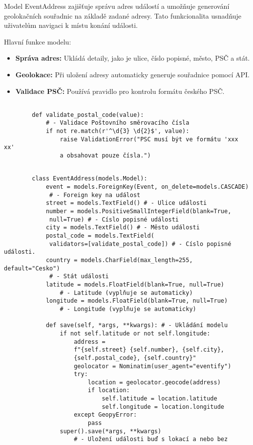 \documentclass[12pt, a4paper,
twoside,        %
openright
]{report}
\begin{document}
\begin{enumerate}
	Model EventAddress zajišťuje správu adres událostí a umožňuje generování geolokačních souřadnic na základě zadané adresy. Tato funkcionalita usnadňuje uživatelům navigaci k místu konání události.
	
	Hlavní funkce modelu:
	
	\begin{itemize}
		\item \textbf{Správa adres:} Ukládá detaily, jako je ulice, číslo popisné, město, PSČ a stát.
		\item \textbf{Geolokace:} Při uložení adresy automaticky generuje souřadnice pomocí API.
		\item \textbf{Validace PSČ:} Používá pravidlo pro kontrolu formátu českého PSČ.
	\end{itemize}
	
	
	\begin{lstlisting}[style=Python, caption={Validace PSČ}]
		
		def validate_postal_code(value): 
			# - Validace Poštovního směrovacího čísla
			if not re.match(r'^\d{3} \d{2}$', value):
				raise ValidationError("PSC musí být ve formátu 'xxx xx' 
				a obsahovat pouze čísla.")
	\end{lstlisting}
	
	\begin{lstlisting}[style=Python, caption={Model EventAddress}]
	
		class EventAddress(models.Model):
			event = models.ForeignKey(Event, on_delete=models.CASCADE)
			 # - Foreign key na událost
			street = models.TextField() # - Ulice události
			number = models.PositiveSmallIntegerField(blank=True,
			 null=True) # - Císlo popisné události
			city = models.TextField() # - Město události
			postal_code = models.TextField(
			 validators=[validate_postal_code]) # - Císlo popisné události.
			country = models.CharField(max_length=255, default="Cesko")
			 # - Stát události
			latitude = models.FloatField(blank=True, null=True)
				# - Latitude (vyplňuje se automaticky)
			longitude = models.FloatField(blank=True, null=True)
				# - Longitude (vyplňuje se automaticky)
		
			def save(self, *args, **kwargs): # - Ukládání modelu
				if not self.latitude or not self.longitude:
					address = 
					f"{self.street} {self.number}, {self.city}, 
					{self.postal_code}, {self.country}"
					geolocator = Nominatim(user_agent="eventify")
					try:
						location = geolocator.geocode(address)
						if location:
							self.latitude = location.latitude
							self.longitude = location.longitude
					except GeopyError:
						pass
				super().save(*args, **kwargs) 
					# - Uložení události buď s lokací a nebo bez
	\end{lstlisting}
	

\end{enumerate}
\end{document}
